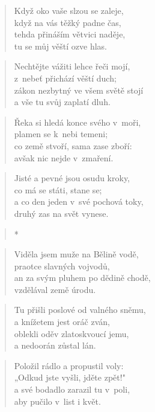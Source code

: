 
\begin{verse}
Když oko vaše slzou se zaleje, \\
když na vás těžký padne čas, \\
tehda přináším větvici naděje, \\
tu se můj věští ozve hlas.
\end{verse}

\begin{verse}
Nechtějte vážiti lehce řeči mojí, \\
z~nebeť přichází věští duch; \\
zákon nezbytný ve všem světě stojí \\
a vše tu svůj zaplatí dluh.
\end{verse}

\begin{verse}
Řeka si hledá konce svého v~moři, \\
plamen se k~nebi temeni; \\
co země stvoří, sama zase zboří: \\
avšak nic nejde v~zmaření.
\end{verse}

\begin{verse}
Jisté a pevné jsou osudu kroky, \\
co má se státi, stane se; \\
a co den jeden v~své pochová toky, \\
druhý zas na svět vynese.
\end{verse}

\begin{verse}
*
\end{verse}

\begin{verse}
Viděla jsem muže na Bělině vodě, \\
praotce slavných vojvodů, \\
an za svým pluhem po dědině chodě, \\
vzdělával země úrodu.
\end{verse}

\begin{verse}
Tu přišli poslové od valného sněmu, \\
a knížetem jest oráč zván, \\
oblekli oděv zlatoskvoucí jemu, \\
a nedoorán zůstal lán.
\end{verse}

\begin{verse}
Položil rádlo a propustil voly: \\
„Odkud jste vyšli, jděte zpět!" \\
a své bodadlo zarazil tu v~poli, \\
aby pučilo v~list i květ.
\end{verse}

